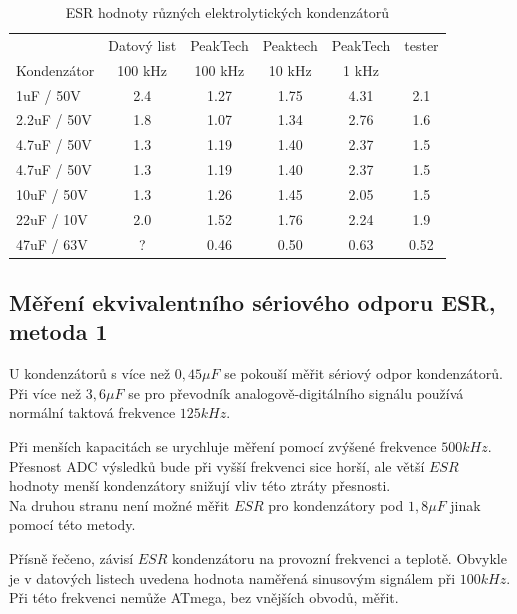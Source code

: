 \begin{table}[H]
  \begin{center}
    \begin{tabular}{| l | c | c | c | c | c |}
   \hline
            & Datový list & PeakTech  & Peaktech & PeakTech & tester \\
Kondenzátor & 100 kHz    & 100 kHz   & 10 kHz   & 1 kHz    &   \\
    \hline
    \hline
1uF / 50V    & 2.4       & 1.27      & 1.75     & 4.31     &  2.1 \\
    \hline
2.2uF / 50V  & 1.8       & 1.07      & 1.34     & 2.76     &  1.6 \\
    \hline
4.7uF / 50V  & 1.3       & 1.19      & 1.40     & 2.37     &  1.5 \\
    \hline
4.7uF / 50V  & 1.3       & 1.19      & 1.40     & 2.37     &  1.5 \\
    \hline
10uF / 50V   & 1.3       & 1.26      & 1.45     & 2.05     &  1.5 \\
    \hline
22uF / 10V   & 2.0       & 1.52      & 1.76     & 2.24     &  1.9 \\
    \hline
47uF / 63V   & ?         & 0.46      & 0.50     & 0.63     &  0.52 \\
    \hline
    \end{tabular}
  \end{center}
  \caption{ESR hodnoty různých elektrolytických kondenzátorů}
  \label{tab:capESR} 
\end{table}


\subsection{Měření ekvivalentního sériového odporu ESR, metoda 1}
U kondenzátorů s více než \(0,45\mu F\) se pokouší měřit sériový odpor kondenzátorů.\\
Při více než \(3,6\mu F\) se pro převodník analogově-digitálního signálu používá normální taktová frekvence \(125kHz\).

Při menších kapacitách se urychluje měření pomocí zvýšené frekvence \(500kHz\).\\
Přesnost ADC výsledků bude při vyšší frekvenci sice horší, ale větší \(ESR\) hodnoty 
menší kondenzátory snižují vliv této ztráty přesnosti.\\
Na druhou stranu není možné měřit \(ESR\) pro kondenzátory pod \(1,8\mu F\) jinak pomocí této metody.

Přísně řečeno, závisí \(ESR\) kondenzátoru na provozní frekvenci a teplotě.
Obvykle je v datových listech uvedena hodnota naměřená sinusovým signálem při \(100kHz\).
Při této frekvenci nemůže ATmega, bez vnějších obvodů, měřit.


